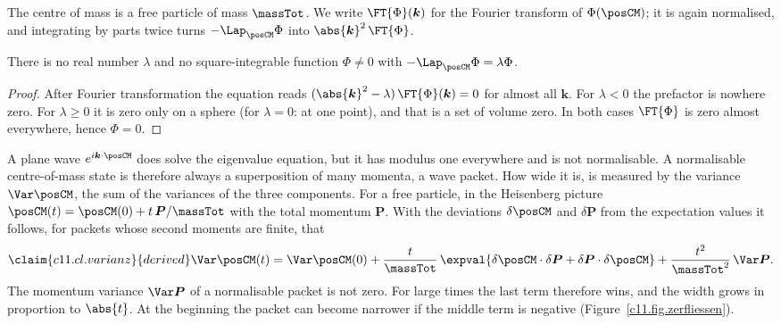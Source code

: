 \begin{vertiefung}[id=c11.v1,
    titel={Why the centre of mass spreads},
    wozu={The Core text asserts that the centre of mass of an atom cannot be an energy
      eigenstate but is always a wave packet, and that this packet spreads. Here is the
      calculation.},
    voraussetzung={Core~\ref{c11.s2} and \ref{c11.s3}; the Fourier transform of
      Chapter~\ref{c05}. Not needed for Sections~\ref{c11.s4} to \ref{c11.s7}.},
    zurueck={The internal density $\abs{\psi}^2$ of an energy eigenstate stands still;
      the density of the centre of mass, and with it the densities of electron and
      proton in the laboratory, spread out.}]
  The centre of mass is a free particle of mass $\massTot$. We write
  $\FT{\Phi}(\boldsymbol{k})$ for the Fourier transform of $\Phi(\posCM)$; it is again
  normalised, and integrating by parts twice turns $-\Lap_{\posCM}\Phi$ into
  $\abs{\boldsymbol{k}}^2\,\FT{\Phi}$.

  \begin{proposition}\label{c11.prop.kein-eigenzustand}
    There is no real number $\lambda$ and no square-integrable function $\Phi \neq 0$ with
    $-\Lap_{\posCM}\Phi = \lambda\Phi$.
  \end{proposition}
  \begin{proof}
    After Fourier transformation the equation reads
    $(\abs{\boldsymbol{k}}^2 - \lambda)\,\FT{\Phi}(\boldsymbol{k}) = 0$ for almost all
    $\boldsymbol{k}$. For $\lambda < 0$ the prefactor is nowhere zero. For
    $\lambda \geq 0$ it is zero only on a sphere (for $\lambda = 0$: at one point), and
    that is a set of volume zero. In both cases $\FT{\Phi}$ is zero almost everywhere,
    hence $\Phi = 0$.
  \end{proof}

  A plane wave $e^{i\boldsymbol{k}\cdot\posCM}$ does solve the eigenvalue equation, but
  it has modulus one everywhere and is not normalisable. A normalisable centre-of-mass
  state is therefore always a superposition of many momenta, a wave packet. How wide it
  is, is measured by the variance $\Var\posCM$, the sum of the variances of the three
  components. For a free particle, in the Heisenberg picture
  $\posCM(t) = \posCM(0) + t\,\boldsymbol{P}/\massTot$ with the total momentum
  $\boldsymbol{P}$. With the deviations $\delta\posCM$ and $\delta\boldsymbol{P}$ from
  the expectation values it follows, for packets whose second moments are finite, that
  \begin{equation}\label{c11.eq.varianz}\claim{c11.cl.varianz}{derived}
    \Var\posCM(t) = \Var\posCM(0)
    + \frac{t}{\massTot}\,\expval{\delta\posCM \cdot \delta\boldsymbol{P}
      + \delta\boldsymbol{P} \cdot \delta\posCM}
    + \frac{t^2}{\massTot^2}\,\Var\boldsymbol{P}.
  \end{equation}
  The momentum variance $\Var\boldsymbol{P}$ of a normalisable packet is not zero. For
  large times the last term therefore wins, and the width grows in proportion to
  $\abs{t}$. At the beginning the packet can become narrower if the middle term is
  negative (Figure~\ref{c11.fig.zerfliessen}).


\end{vertiefung}
